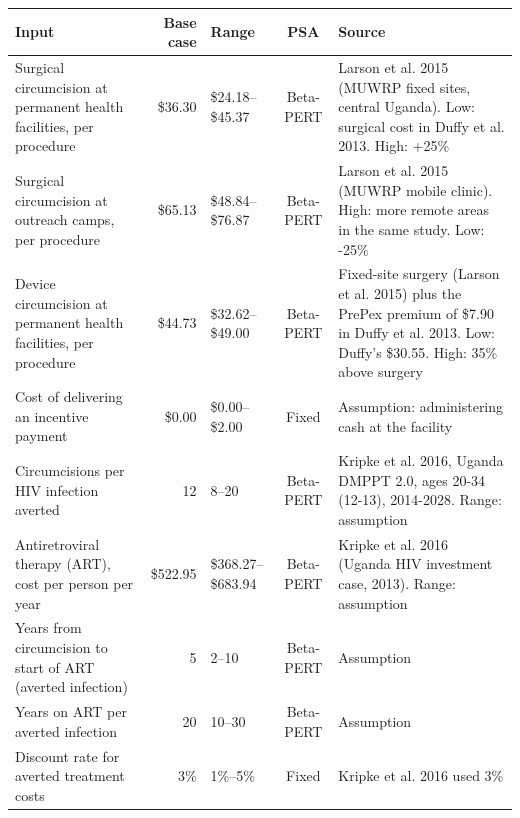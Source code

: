 \begin{tabular}{>{\raggedright\arraybackslash}p{4.2cm}rlc>{\raggedright\arraybackslash}p{5.2cm}}
\toprule
Input & Base case & Range & PSA & Source
\\
\midrule
Surgical circumcision at permanent health facilities, per procedure & \$36.30 & \$24.18--\$45.37 & Beta-PERT & Larson et al. 2015 (MUWRP fixed sites, central Uganda). Low: surgical cost in Duffy et al. 2013. High: +25\% \\
Surgical circumcision at outreach camps, per procedure & \$65.13 & \$48.84--\$76.87 & Beta-PERT & Larson et al. 2015 (MUWRP mobile clinic). High: more remote areas in the same study. Low: -25\% \\
Device circumcision at permanent health facilities, per procedure & \$44.73 & \$32.62--\$49.00 & Beta-PERT & Fixed-site surgery (Larson et al. 2015) plus the PrePex premium of \$7.90 in Duffy et al. 2013. Low: Duffy's \$30.55. High: 35\% above surgery \\
Cost of delivering an incentive payment & \$0.00 & \$0.00--\$2.00 & Fixed & Assumption: administering cash at the facility \\
Circumcisions per HIV infection averted & 12 & 8--20 & Beta-PERT & Kripke et al. 2016, Uganda DMPPT 2.0, ages 20-34 (12-13), 2014-2028. Range: assumption \\
Antiretroviral therapy (ART), cost per person per year & \$522.95 & \$368.27--\$683.94 & Beta-PERT & Kripke et al. 2016 (Uganda HIV investment case, 2013). Range: assumption \\
Years from circumcision to start of ART (averted infection) & 5 & 2--10 & Beta-PERT & Assumption \\
Years on ART per averted infection & 20 & 10--30 & Beta-PERT & Assumption \\
Discount rate for averted treatment costs & 3\% & 1\%--5\% & Fixed & Kripke et al. 2016 used 3\% \\
\bottomrule
\end{tabular}
